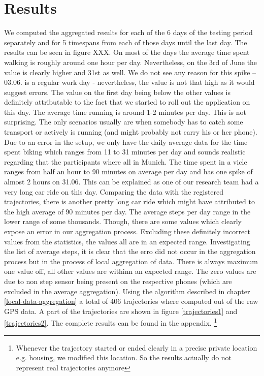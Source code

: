 \section{Results}
We computed the aggregated results for each of the 6 days of the testing period separately and for 5 timespans from each of those days until the last day. The results can be seen in figure XXX. 
On most of the days the average time spent walking is roughly around one hour per day. Nevertheless, on the 3rd of June the value is clearly higher and 31st as well. We do not see any reason for this spike -- 03.06. is a regular work day - nevertheless, the value is not that high as it would suggest errors. The value on the first day being below the other values is definitely attributable to the fact that we started to roll out the application on this day.
The average time running is around 1-2 minutes per day. This is not surprising. The only scenarios usually are when somebody has to catch some transport or actively is running (and might probably not carry his or her phone).
Due to an error in the setup, we only have the daily average data for the time spent biking which ranges from 11 to 31 minutes per day and sounds realistic regarding that the participants where all in Munich.
The time spent in a  vicle ranges from half an hour to 90 minutes on average per day and has one spike of almost 2 hours on 31.06. This can be explained as one of our research team had a very long car ride on this day. Comparing the data with the registered trajectories, there is another pretty long car ride which might have attributed to the high average of 90 minutes per day. 
The average steps per day range in the lower range of some thousands. Though, there are some values which clearly expose an error in our aggregation process. Excluding these definitely incorrect values from the statistics, the values all are in an expected range. 
Investigating the list of average steps, it is clear that the erro did not occur in the aggregation process but in the process of local aggregation of data. There is always maximum one value off, all other values are withinn an expected range. The zero values are due to non step sensor being present on the respective phones (which are excluded in the average aggregation).
Using the algorithm described in chapter \ref{local-data-aggregation} a total of 406 trajectories where computed out of the raw GPS data. A part of the trajectories are shown in figure \ref{trajectories1} and \ref{trajectories2}. The complete results can be found in the appendix. \footnote{Whenever the trajectory started or ended clearly in a precise private location e.g. housing, we modified this location. So the results actually do not represent real trajectories anymore}

